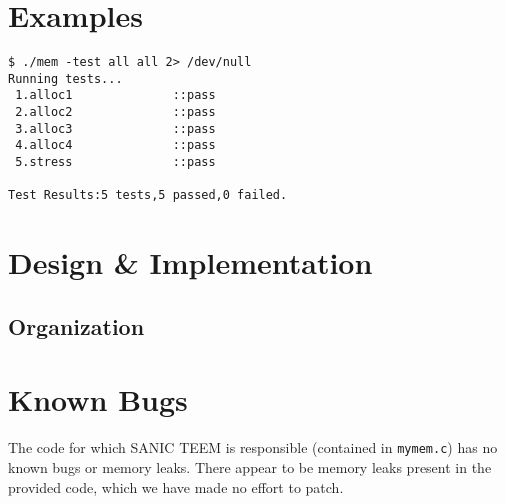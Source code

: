\documentclass[paper=a4, fontsize=11pt]{scrartcl}
\begin{document}
\section*{Examples}
\begin{lstlisting}[style=ShellStyle]
$ ./mem -test all all 2> /dev/null
Running tests...
 1.alloc1              ::pass
 2.alloc2              ::pass
 3.alloc3              ::pass
 4.alloc4              ::pass
 5.stress              ::pass

Test Results:5 tests,5 passed,0 failed.
\end{lstlisting}

\section*{Design \& Implementation}
\subsection*{Organization}




\section*{Known Bugs}
The code for which SANIC TEEM is responsible (contained in \texttt{mymem.c}) has no known bugs or memory leaks. There appear to be memory leaks present in the provided code, which we have made no effort to patch.
\end{document}
